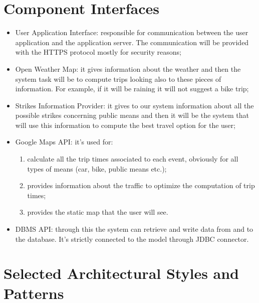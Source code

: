 \section{Component Interfaces}
\begin{itemize}
\item	User Application Interface: responsible for communication between the user application and the application server. The communication will be provided with the HTTPS protocol mostly for security reasons;
\item	Open Weather Map: it gives information about the weather and then the system task will be to compute trips looking also to these pieces of information. For example, if it will be raining it will not suggest a bike trip;
\item	Strikes Information Provider: it gives to our system information about all the possible strikes concerning public means and then it will be the system that will use this information to compute the best travel option for the user;
\item	Google Maps API: it’s used for:
\begin{enumerate}
\item	calculate all the trip times associated to each event, obviously for all types of means (car, bike, public means etc.);
\item	provides information about the traffic to optimize the computation of trip times;
\item	provides the static map that the user will see.
\end{enumerate}
\item	DBMS API: through this the system can retrieve and write data from and to the database. It’s strictly connected to the model through JDBC connector.
\end{itemize}
%
%
\section{Selected Architectural Styles and Patterns}


